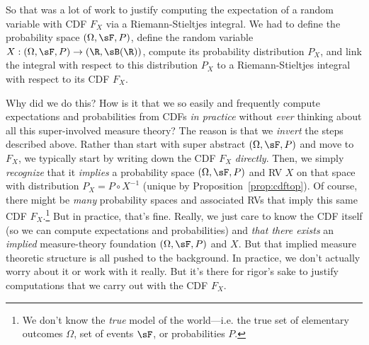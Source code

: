 \documentclass[12pt]{article}
\theoremstyle{plain}
\theoremstyle{definition}
\theoremstyle{remark}
\newcommand{\ra}{\rightarrow}
\begin{document}

So that was a lot of work to justify computing the expectation of a
random variable with CDF $F_X$ via a Riemann-Stieltjes integral.  We had
to define the probability space $(\Omega,\sF,P)$, define the random
variable $X:(\Omega,\sF,P)\ra(\R,\sB(\R))$, compute its probability
distribution $P_X$, and link the integral with respect to this
distribution $P_X$ to a Riemann-Stieltjes integral with respect to its
CDF $F_X$.

Why did we do this? How is it that we so easily and frequently compute
expectations and probabilities from CDFs \emph{in practice} without
\emph{ever} thinking about all this super-involved measure theory?
The reason is that we \emph{invert} the steps described above.
Rather than start with super abstract $(\Omega,\sF,P)$ and move to
$F_X$, we typically start by writing down the CDF $F_X$ \emph{directly}.
Then, we simply \emph{recognize} that it \emph{implies} a probability
space $(\Omega,\sF,P)$ and RV $X$ on that space with distribution
$P_X=P\circ X^{-1}$ (unique by Proposition~\ref{prop:cdftop}).  Of
course, there might be \emph{many} probability spaces and associated RVs
that imply this same CDF $F_X$.\footnote{%
  We don't know the \emph{true} model of the world---i.e. the true set
  of elementary outcomes $\Omega$, set of events $\sF$, or probabilities
  $P$.
}
But in practice, that's fine. Really, we just care to know the CDF
itself (so we can compute expectations and probabilities) and
\emph{that there exists} an \emph{implied} measure-theory foundation
$(\Omega,\sF,P)$ and $X$.
But that implied measure theoretic structure is all pushed to the
background. In practice, we don't actually worry about it or work with
it really. But it's there for rigor's sake to justify computations
that we carry out with the CDF $F_X$.
\end{document}
